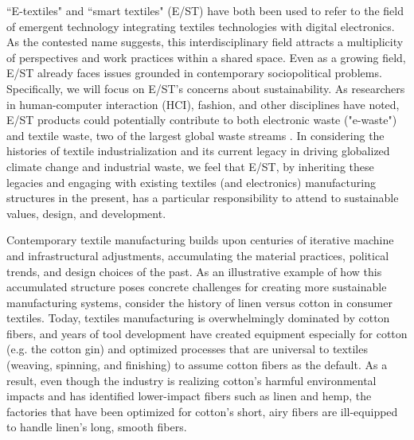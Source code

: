 \documentclass[manuscript,review,anonymous]{acmart}
\begin{document}
``E-textiles" and ``smart textiles" (E/ST) have both been used to refer to the field of emergent technology integrating textiles technologies with digital electronics. As the contested name suggests, this interdisciplinary field attracts a multiplicity of perspectives and work practices within a shared space. Even as a growing field, E/ST already faces issues grounded in contemporary sociopolitical problems. Specifically, we will focus on E/ST's concerns about sustainability. As researchers in human-computer interaction (HCI), fashion, and other disciplines have noted, E/ST products could potentially contribute to both electronic waste ("e-waste") and textile waste, two of the largest global waste streams
\cite{sandin_environmental_2018, forti_global_2020}.
In considering the histories of textile industrialization and its current legacy in driving globalized climate change and industrial waste, we feel that E/ST, by inheriting these legacies and engaging with existing textiles (and electronics) manufacturing structures in the present, has a particular responsibility to attend to sustainable values, design, and development. 

Contemporary textile manufacturing builds upon centuries of iterative machine and infrastructural adjustments, accumulating the material practices, political trends, and design choices of the past. As an illustrative example of how this accumulated structure poses concrete challenges for creating more sustainable manufacturing systems, consider the history of linen versus cotton in consumer textiles. Today, textiles manufacturing is overwhelmingly dominated by cotton fibers, and years of tool development have created equipment especially for cotton (e.g. the cotton gin) and optimized processes that are universal to textiles (weaving, spinning, and finishing) to assume cotton fibers as the default. As a result, even though the industry is realizing cotton's harmful environmental impacts and has identified lower-impact fibers such as linen and hemp, the factories that have been optimized for cotton's short, airy fibers are ill-equipped to handle linen's long, smooth fibers. \cite{kozlowski_handbook_2020}
\end{document}
